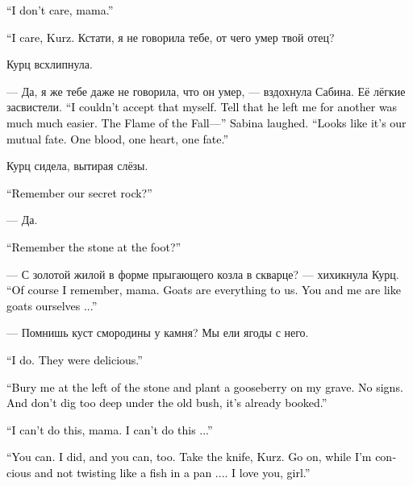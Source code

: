 \documentclass[a4paper,12pt,fleqn]{book}\usepackage{cooltooltips}\usepackage{polyglossia}\setdefaultlanguage[babelshorthands=true]{russian}\setotherlanguage{english}\defaultfontfeatures{Ligatures=TeX,Mapping=tex-text} \usepackage{xcolor}\definecolor{lightgray}{HTML}{bbbbbb}\color{lightgray}\newcommand{\ml}[3]{\textenglish{\textcolor{black}{#3}}}
\begin{document}
\ml{$0$}
{--- Мне всё равно, мама.}
{``I don't care, mama.''}

\ml{$0$}
{--- Мне не всё равно, Курц.}
{``I care, Kurz.}
Кстати, я не говорила тебе, от чего умер твой отец?

Курц всхлипнула.

--- Да, я же тебе даже не говорила, что он умер, --- вздохнула Сабина.
Её лёгкие засвистели.
\ml{$0$}
{--- Я сама не могла с этим смириться.}
{``I couldn't accept that myself.}
\ml{$0$}
{Проще было сказать, что он ушёл к другой.}
{Tell that he left me for another was much much easier.}
\ml{$0$}
{Пламя Осени... --- Сабина усмехнулась.}
{The Flame of the Fall---'' Sabina laughed.}
\ml{$0$}
{--- Видать, судьба у нас с ним такая.}
{``Looks like it's our mutual fate.}
\ml{$0$}
{Одна кровь, одно сердце, одна судьба.}
{One blood, one heart, one fate.''}

Курц сидела, вытирая слёзы.

\ml{$0$}
{--- Помнишь нашу тайную скалу?}
{``Remember our secret rock?''}

--- Да.

\ml{$0$}
{--- Помнишь камень у подножия?}
{``Remember the stone at the foot?''}

--- С золотой жилой в форме прыгающего козла в скварце? --- хихикнула Курц.
\ml{$0$}
{--- Конечно, помню, мама.}
{``Of course I remember, mama.}
\ml{$0$}
{Козы --- это наше всё.}
{Goats are everything to us.}
\ml{$0$}
{Мы сами как козы с тобой...}
{You and me are like goats ourselves ...''}

--- Помнишь куст смородины у камня?
Мы ели ягоды с него.

\ml{$0$}
{--- Да.}
{``I do.}
\ml{$0$}
{Было вкусно.}
{They were delicious.''}

\ml{$0$}
{--- Похорони меня слева от камня и посади смородину на моей могиле.}
{``Bury me at the left of the stone and plant a gooseberry on my grave.}
\ml{$0$}
{Надписей не нужно.}
{No signs.}
\ml{$0$}
{Под старым кустом больно не копай, там уже занято.}
{And don't dig too deep under the old bush, it's already booked.''}

\ml{$0$}
{--- Я не смогу, мама.}
{``I can't do this, mama.}
\ml{$0$}
{Я не смогу...}
{I can't do this ...''}

\ml{$0$}
{--- Сможешь.}
{``You can.}
\ml{$0$}
{Я смогла и ты сможешь.}
{I did, and you can, too.}
\ml{$0$}
{Бери нож, Курц.}
{Take the knife, Kurz.}
\ml{$0$}
{Давай, пока я в сознании и не верчусь как рыбина на сковородке...}
{Go on, while I'm concious and not twisting like a fish in a pan ....}
\ml{$0$}
{Я люблю тебя, девочка.}
{I love you, girl.''}
\end{document}
